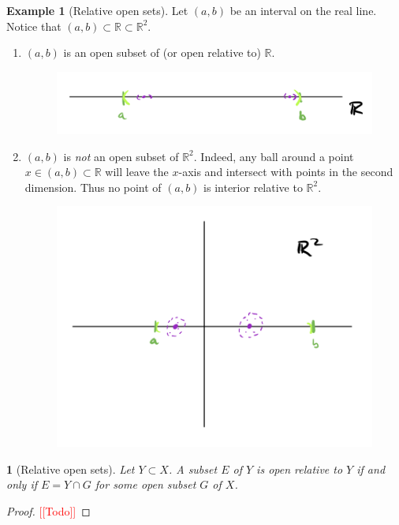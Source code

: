 \documentclass[12pt]{article}
\numberwithin{equation}{section}
\theoremstyle{plain}
\newtheorem{theorem}{\color{ForestGreen}{\textbf{Theorem}}}[section]
\theoremstyle{definition}
\newtheorem{example}{\color{WildStrawberry}Example}[section]
\newcommand{\1}{\mathbbm 1}
\newcommand{\RR}{\mathbb R}
\begin{document}
\begin{example}[Relative open sets]
	Let $(a,b)$ be an interval on the real line. Notice that $(a,b) \subset \RR \subset \RR^2$.
	\begin{enumerate}
		\item $(a,b)$ is an open subset of (or open relative to) $\RR$.
		\begin{figure}[H]
			\begin{center}
				\includegraphics[scale=.75]{open_relative_r.png}
			\end{center}
		\end{figure}
		\item $(a,b)$ is \emph{not} an open subset of $\RR^2$. Indeed, any ball around a point $x \in (a,b) \subset \RR$ will leave the $x$-axis and intersect with points in the second dimension. Thus no point of $(a,b)$ is interior relative to $\RR^2$.
		\begin{figure}[H]
			\begin{center}
				\includegraphics[scale=.75]{open_relative_r2.png}
			\end{center}
		\end{figure}  
	\end{enumerate}
\end{example}


\begin{theorem}[Relative open sets]
	Let $Y \subset X$. A subset $E$ of $Y$ is open relative to $Y$ if and only if $E = Y \cap G$ for some open subset $G$ of $X$. 
\end{theorem}
\begin{proof}
	\textcolor{red}{[[Todo]]}
\end{proof}
\end{document}
